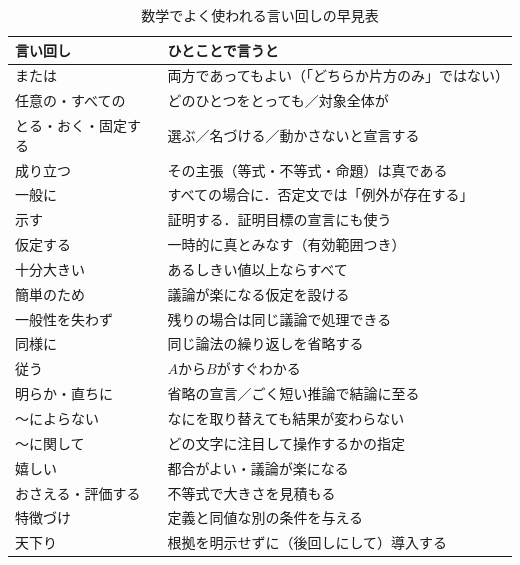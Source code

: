 \begin{table}[htbp]
  \centering
  \small
  \begin{tabular}{L{3.8cm} L{8.6cm}}
    \toprule
    \textbf{言い回し} & \textbf{ひとことで言うと} \\
    \midrule
    または & 両方であってもよい（「どちらか片方のみ」ではない） \\
    任意の・すべての & どのひとつをとっても／対象全体が \\
    とる・おく・固定する & 選ぶ／名づける／動かさないと宣言する \\
    成り立つ & その主張（等式・不等式・命題）は真である \\
    一般に & すべての場合に．否定文では「例外が存在する」 \\
    示す & 証明する．証明目標の宣言にも使う \\
    仮定する & 一時的に真とみなす（有効範囲つき） \\
    十分大きい & あるしきい値以上ならすべて \\
    簡単のため & 議論が楽になる仮定を設ける \\
    一般性を失わず & 残りの場合は同じ議論で処理できる \\
    同様に & 同じ論法の繰り返しを省略する \\
    従う & $A$から$B$がすぐわかる \\
    明らか・直ちに & 省略の宣言／ごく短い推論で結論に至る \\
    〜によらない & なにを取り替えても結果が変わらない \\
    〜に関して & どの文字に注目して操作するかの指定 \\
    嬉しい & 都合がよい・議論が楽になる \\
    おさえる・評価する & 不等式で大きさを見積もる \\
    特徴づけ & 定義と同値な別の条件を与える \\
    天下り & 根拠を明示せずに（後回しにして）導入する \\
    \bottomrule
  \end{tabular}
  \caption{数学でよく使われる言い回しの早見表}
  \label{tab:言い回し早見表}
\end{table}
